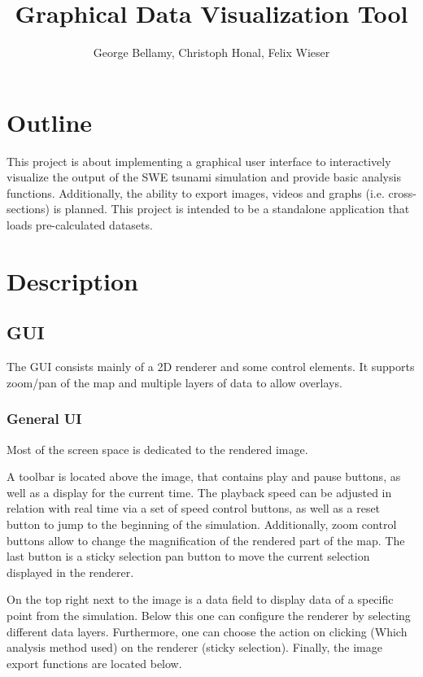 \documentclass[paper=a4]{proc}
\title{Graphical Data Visualization Tool}
\author{George Bellamy, Christoph Honal, Felix Wieser}
\begin{document}
	\maketitle
	\thispagestyle{plain}	%
	\section{Outline}
		This project is about implementing a graphical user interface to interactively visualize the output of the SWE tsunami simulation and provide basic analysis functions. Additionally, the ability to export images, videos and graphs (i.e. cross-sections) is planned. This project is intended to be a standalone application that loads pre-calculated datasets.
	\section{Description}
		\subsection{GUI}
			The GUI consists mainly of a 2D renderer and some control elements. It  supports zoom/pan of the map and multiple layers of data to allow overlays.
			\subsubsection{General UI}
			Most of the screen space is dedicated to the rendered image.
			
			A toolbar is located above the image, that contains play and pause buttons, as well as a display for the current time. The playback speed can be adjusted in relation with real time via a set of speed control buttons, as well as a reset button to jump to the beginning of the simulation. Additionally, zoom control buttons allow to change the magnification of the rendered part of the map. The last button is a sticky selection pan button to move the current selection displayed in the renderer.
			
			On the top right next to the image is a data field to display data of a specific point from the simulation. Below this one can configure the renderer by selecting different data layers. Furthermore, one can choose the action on clicking (Which analysis method used) on the renderer (sticky selection). Finally, the image export functions are located below.
			
\end{document}
